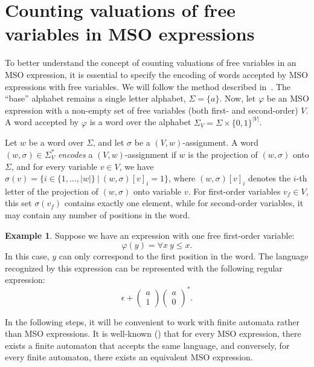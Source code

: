 \documentclass[en]{pracamgr}
\newcommand{\icol}[1]{%
  \left(\begin{smallmatrix}#1\end{smallmatrix}\right)%
}
\theoremstyle{definition}
\newtheorem{example}{Example}[section]
\begin{document}
\section{Counting valuations of free variables in MSO expressions}

To better understand the concept of counting valuations of free variables in an MSO expression, it is essential to specify the encoding of words accepted by MSO expressions with free variables. We will follow the method described in~\cite{KreutzerR13}. The ``base'' alphabet remains a single letter alphabet, $\Sigma = \{a\}$. Now, let $\varphi$ be an MSO expression with a non-empty set of free variables (both first- and second-order) $V$. A word accepted by $\varphi$ is a word over the alphabet $\Sigma_V = \Sigma \times \{0, 1\}^{|V|}$. 

Let $w$ be a word over $\Sigma$, and let $\sigma$ be a $(V, w)$-assignment. A word $(w, \sigma) \in \Sigma_V^*$ \emph{encodes} a $(V, w)$-assignment if $w$ is the projection of $(w, \sigma)$ onto $\Sigma$, and for every variable $v \in V$, we have $\sigma(v) = \{i \in \{1,\ldots,|w|\} \ | \ (w, \sigma)[v]_i = 1 \}$, where $(w, \sigma)[v]_i$ denotes the $i$-th letter of the projection of $(w, \sigma)$ onto variable $v$. For first-order variables $v_f \in V$, this set $\sigma(v_f)$ contains exactly one element, while for second-order variables, it may contain any number of positions in the word.

\begin{example}
    Suppose we have an expression with one free first-order variable:
    $$\varphi(y) = \forall x \ y \leq x.$$
    In this case, $y$ can only correspond to the first position in the word. The language recognized by this expression can be represented with the following regular expression: 
    $$\epsilon + \icol{a\\1}\icol{a\\0}^*.$$
\end{example}

In the following steps, it will be convenient to work with finite automata rather than MSO expressions. It is well-known (\cite{Buchi1960}) that for every MSO expression, there exists a finite automaton that accepts the same language, and conversely, for every finite automaton, there exists an equivalent MSO expression.
\end{document}
